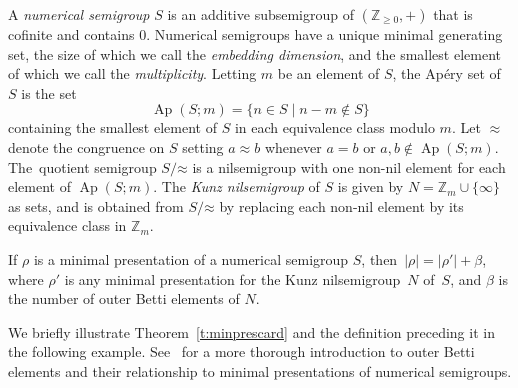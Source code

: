 \documentclass[ALCO, Unicode]{cedram}
\newcommand\ZZ{\mathbb{Z}}
\newcommand\app{\mathord\approx}
\DeclareMathOperator\Ap{Ap}
\begin{document}
A \emph{numerical semigroup} $S$ is an additive subsemigroup of $(\ZZ_{\geq 0}, +)$ that is cofinite and contains $0$.  Numerical semigroups have a unique minimal generating set, the size of which we call the \emph{embedding dimension}, and the smallest element of which we call the \emph{multiplicity}. Letting $m$ be an element of $S$, the Ap\'ery set of $S$ is the set 
\[
\Ap(S;m) = \{n \in S \mid n - m \notin S\}
\]
containing the smallest element of $S$ in each equivalence class modulo $m$.  
Let $\approx$ denote the congruence on $S$ setting $a \approx b$ whenever $a = b$ or $a,b \notin \Ap(S;m)$.  The~quotient semigroup $S/\app$ is a nilsemigroup with one non-nil element for each element of $\Ap(S;m)$.  The \emph{Kunz nilsemigroup} of $S$ is given by $N = \ZZ_m \cup \{\infty\}$ as sets, and is obtained from $S/\app$ by replacing each non-nil element by its equivalence class in $\ZZ_m$.  

\begin{thm}\label{t:minprescard}
If $\rho$ is a minimal presentation of a numerical semigroup $S$, then~$|\rho| = |\rho'| + \beta$, where $\rho'$ is any minimal presentation for the Kunz nilsemigroup~$N$ of~$S$, and $\beta$ is the number of outer Betti elements of $N$.  
\end{thm}

We briefly illustrate Theorem~\ref{t:minprescard} and the definition preceding it in the following example.  See~\cite{minprescard,kunzfaces3} for a more thorough introduction to outer Betti elements and their relationship to minimal presentations of numerical semigroups.  
\end{document}
